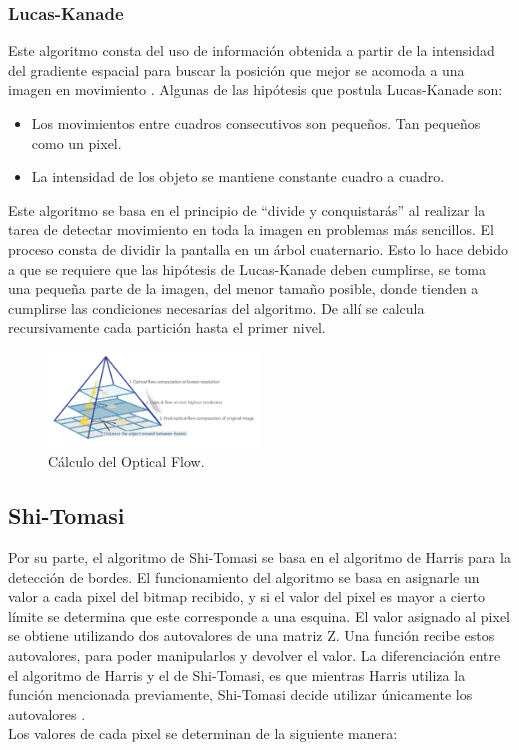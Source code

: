 \subsubsection{Lucas-Kanade} 
Este algoritmo consta del uso de información obtenida a partir de la intensidad del gradiente espacial para buscar la posición que mejor se acomoda a una imagen en movimiento \cite{ref:lucas-kanade} \cite{ref:lucas-kanade2}. Algunas de las hipótesis que postula Lucas-Kanade son:
\begin{itemize}
\item Los movimientos entre cuadros consecutivos son pequeños. Tan pequeños como un pixel.
\item La intensidad de los objeto se mantiene constante cuadro a cuadro.
\end{itemize} 
Este algoritmo se basa en el principio de ``divide y conquistarás'' al realizar la tarea de detectar movimiento en toda la imagen en problemas más sencillos. El proceso consta de dividir la pantalla en un árbol cuaternario. Esto lo hace debido a que se requiere que las hipótesis de Lucas-Kanade deben cumplirse, se toma una pequeña parte de la imagen, del menor tamaño posible, donde tienden a cumplirse las condiciones necesarias del algoritmo. De allí se calcula recursivamente cada partición hasta el primer nivel.
\begin{figure}[H]
		\centering
		\includegraphics[width=0.5\textwidth]{Imagenes/op.png}
		\caption{Cálculo del Optical Flow.}
		\label{fig:opticalflow1}
\end{figure}
\subsection{Shi-Tomasi}

Por su parte, el algoritmo de Shi-Tomasi se basa en el algoritmo de Harris para la detección de bordes. El funcionamiento del algoritmo se basa en asignarle un valor a cada pixel del bitmap recibido, y si el valor del pixel es mayor a cierto límite se determina que este corresponde a una esquina. El valor asignado al pixel se obtiene utilizando dos autovalores de una matriz Z. Una función recibe estos autovalores, para poder manipularlos y devolver el valor.
La diferenciación entre el algoritmo de Harris y el de Shi-Tomasi, es que mientras Harris utiliza la función mencionada previamente, Shi-Tomasi decide utilizar únicamente los autovalores \cite{ref:shi-tomasi}.
\\ Los valores de cada pixel se determinan de la siguiente manera:

